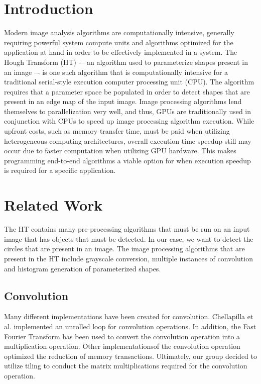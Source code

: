 \documentclass[conference]{IEEEtran}
\begin{document}

\section{Introduction}
Modern image analysis algorithms are computationally intensive, generally requiring powerful system compute units and algorithms optimized for the application at hand in order to be effectively implemented in a system. 
The Hough Transform (HT)\cite{BALLARD1981111} -– an algorithm used to parameterize shapes present in an image –- is one such algorithm that is computationally intensive for a traditional serial-style execution computer processing unit (CPU).
The algorithm requires that a parameter space be populated in order to detect shapes that are present in an edge map of the input image.
Image processing algorithms lend themselves to parallelization very well, and thus, GPUs are traditionally used in conjunction with CPUs to speed up image processing algorithm execution.
While upfront costs, such as memory transfer time, must be paid when utilizing heterogeneous computing architectures, overall execution time speedup still may occur due to faster computation when utilizing GPU hardware.
This makes programming end-to-end algorithms a viable option for when execution speedup is required for a specific application.


\section{Related Work}
The HT contains many pre-processing algorithms that must be run on an input image that has objects that must be detected.
In our case, we want to detect the circles that are present in an image.
The image processing algorithms that are present in the HT include grayscale conversion, multiple instances of convolution and histogram generation of parameterized shapes.

\subsection{Convolution}
Many different implementations have been created for convolution. Chellapilla et al.\cite{document-parsing} implemented an unrolled loop for convolution operations.
In addition, the Fast Fourier Transform has been used to convert the convolution operation into a multiplication operation\cite{vasilache2015fast}.
Other implementations\cite{9229640}of the convolution operation optimized the reduction of memory transactions.
Ultimately, our group decided to utilize tiling to conduct the matrix multiplications required for the convolution operation.
\end{document}
